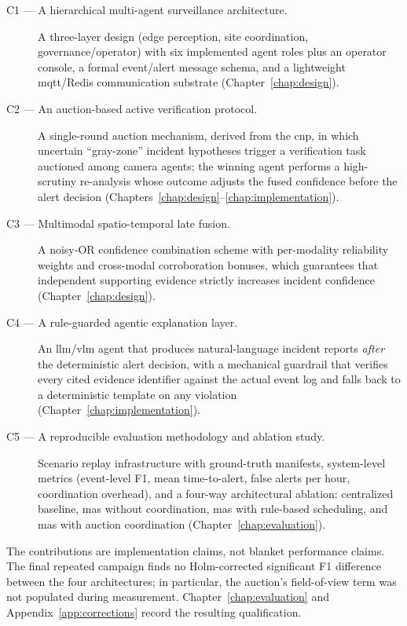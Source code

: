 \begin{description}
    \item[C1 --- A hierarchical multi-agent surveillance architecture.] A three-layer design (edge perception, site coordination, governance/operator) with six implemented agent roles plus an operator console, a formal event/alert message schema, and a lightweight \gls{mqtt}/Redis communication substrate (Chapter~\ref{chap:design}).
    \item[C2 --- An auction-based active verification protocol.] A single-round auction mechanism, derived from the \gls{cnp}, in which uncertain ``gray-zone'' incident hypotheses trigger a verification task auctioned among camera agents; the winning agent performs a high-scrutiny re-analysis whose outcome adjusts the fused confidence before the alert decision (Chapters~\ref{chap:design}--\ref{chap:implementation}).
    \item[C3 --- Multimodal spatio-temporal late fusion.] A noisy-OR confidence combination scheme with per-modality reliability weights and cross-modal corroboration bonuses, which guarantees that independent supporting evidence strictly increases incident confidence (Chapter~\ref{chap:design}).
    \item[C4 --- A rule-guarded agentic explanation layer.] An \gls{llm}/\gls{vlm} agent that produces natural-language incident reports \emph{after} the deterministic alert decision, with a mechanical guardrail that verifies every cited evidence identifier against the actual event log and falls back to a deterministic template on any violation (Chapter~\ref{chap:implementation}).
    \item[C5 --- A reproducible evaluation methodology and ablation study.] Scenario replay infrastructure with ground-truth manifests, system-level metrics (event-level F1, mean time-to-alert, false alerts per hour, coordination overhead), and a four-way architectural ablation: centralized baseline, \gls{mas} without coordination, \gls{mas} with rule-based scheduling, and \gls{mas} with auction coordination (Chapter~\ref{chap:evaluation}).
\end{description}

\begin{revisionbox}
The contributions are implementation claims, not blanket performance claims.
The final repeated campaign finds no Holm-corrected significant F1 difference
between the four architectures; in particular, the auction's field-of-view
term was not populated during measurement. Chapter~\ref{chap:evaluation}
and Appendix~\ref{app:corrections} record the resulting qualification.
\end{revisionbox}

